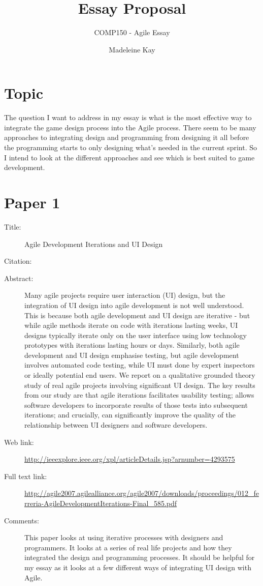 \documentclass{scrartcl}
\title{Essay Proposal}
\subtitle{COMP150 - Agile Essay}
\author{Madeleine Kay}
\begin{document}
\maketitle

\section*{Topic}
The question I want to address in my essay is what is the most effective way to integrate the game design process into the Agile process. There seem to be many approaches to integrating design and programming from designing it all before the programming starts to only designing what's needed in the current sprint. So I intend to look at the different approaches and see which is best suited to game development.

\section*{Paper 1}
\begin{description}
	\item[Title:] Agile Development Iterations and UI Design	
	\item[Citation:] \cite{Ferreira}
	\item[Abstract:] Many agile projects require user interaction (UI) design, but the integration of UI design into agile development is not well understood. This is because both agile development and UI design are iterative - but while agile methods iterate on code with iterations lasting weeks, UI designs typically iterate only on the user interface using low technology prototypes with iterations lasting hours or days. Similarly, both agile development and UI design emphasise testing, but agile development involves automated code testing, while UI must done by expert inspectors or ideally potential end users. We report on a qualitative grounded theory study of real agile projects involving significant UI design. The key results from our study are that agile iterations facilitates usability testing; allows software developers to incorporate results of those tests into subsequent iterations; and crucially, can significantly improve the quality of the relationship between UI designers and software developers.
	\item[Web link:] \url{http://ieeexplore.ieee.org/xpl/articleDetails.jsp?arnumber=4293575}
	\item[Full text link:] \url{http://agile2007.agilealliance.org/agile2007/downloads/proceedings/012_ferreria-AgileDevelopmentIterations-Final_585.pdf}
	\item[Comments:]  This paper looks at using iterative processes with designers and programmers. It looks at a series of real life projects and how they integrated the design and programming processes. It should be helpful for my essay as it looks at a few different ways of integrating UI design with Agile.
\end{description}
\end{document}
